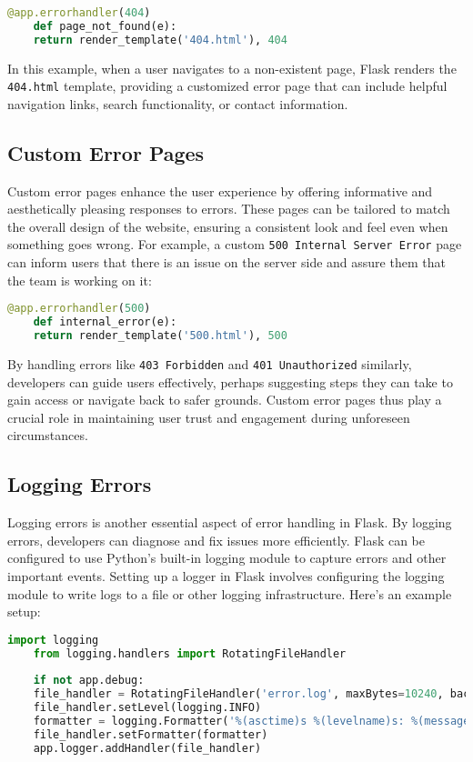 \begin{lstlisting}[language=Python]
	@app.errorhandler(404)
	def page_not_found(e):
	return render_template('404.html'), 404
\end{lstlisting}

In this example, when a user navigates to a non-existent page, Flask renders the \texttt{404.html} template, providing a customized error page that can include helpful navigation links, search functionality, or contact information.

\subsection{Custom Error Pages}

Custom error pages enhance the user experience by offering informative and aesthetically pleasing responses to errors. These pages can be tailored to match the overall design of the website, ensuring a consistent look and feel even when something goes wrong. For example, a custom \texttt{500 Internal Server Error} page can inform users that there is an issue on the server side and assure them that the team is working on it:

\begin{lstlisting}[language=Python]
	@app.errorhandler(500)
	def internal_error(e):
	return render_template('500.html'), 500
\end{lstlisting}

By handling errors like \texttt{403 Forbidden} and \texttt{401 Unauthorized} similarly, developers can guide users effectively, perhaps suggesting steps they can take to gain access or navigate back to safer grounds. Custom error pages thus play a crucial role in maintaining user trust and engagement during unforeseen circumstances.

\subsection{Logging Errors}

Logging errors is another essential aspect of error handling in Flask. By logging errors, developers can diagnose and fix issues more efficiently. Flask can be configured to use Python’s built-in logging module to capture errors and other important events. Setting up a logger in Flask involves configuring the logging module to write logs to a file or other logging infrastructure.\cite{Flaskdocs:2024} Here's an example setup:

\begin{lstlisting}[language=Python]
	import logging
	from logging.handlers import RotatingFileHandler
	
	if not app.debug:
	file_handler = RotatingFileHandler('error.log', maxBytes=10240, backupCount=10)
	file_handler.setLevel(logging.INFO)
	formatter = logging.Formatter('%(asctime)s %(levelname)s: %(message)s [in %(pathname)s:%(lineno)d]')
	file_handler.setFormatter(formatter)
	app.logger.addHandler(file_handler)
\end{lstlisting}

